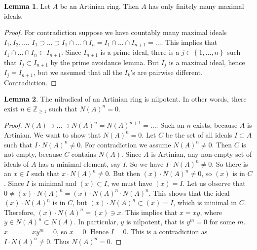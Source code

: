 \documentclass{article}
\newcommand{\Z}{\mathbb{Z}}
\newcommand{\rb}[1]{\left( #1 \right)}
\newcommand{\cb}[1]{\left\{ #1 \right\}}
\theoremstyle{definition}\newtheorem{definition}{Definition}[section]
\theoremstyle{definition}\newtheorem{remark}[definition]{Remark}
\theoremstyle{definition}\newtheorem*{example}{Example}
\theoremstyle{definition}\newtheorem*{note}{Note}
\newtheorem{lemma}[definition]{Lemma}
\begin{document}
\begin{lemma}
Let $ A $ be an Artinian ring. Then $ A $ has only finitely many maximal ideals.
\end{lemma}

\begin{proof}
For contradiction suppose we have countably many maximal ideals $ I_1, I_2, \dots $. $ I_1 \supset \dots \supset I_1 \cap \dots \cap I_n = I_1 \cap \dots \cap I_{n + 1} = \dots $. This implies that $ I_1 \cap \dots \cap I_n \subset I_{n + 1} $. Since $ I_{n + 1} $ is a prime ideal, there is a $ j \in \cb{1, \dots, n} $ such that $ I_j \subset I_{n + 1} $ by the prime avoidance lemma. But $ I_j $ is a maximal ideal, hence $ I_j = I_{n + 1} $, but we assumed that all the $ I_k $'s are pairwise different. Contradiction.
\end{proof}

\begin{lemma}
The nilradical of an Artinian ring is nilpotent. In other words, there exist $ n \in \Z_{\ge 1} $ such that $ N\rb{A}^n = 0 $.
\end{lemma}

\begin{proof}
$ N\rb{A} \supset \dots \supset N\rb{A}^n = N\rb{A}^{n + 1} = \dots $. Such an $ n $ exists, because $ A $ is Artinian. We want to show that $ N\rb{A}^n = 0 $. Let $ C $ be the set of all ideals $ I \subset A $ such that $ I \cdot N\rb{A}^n \ne 0 $. For contradiction we assume $ N\rb{A}^n \ne 0 $. Then $ C $ is not empty, because $ C $ contains $ N\rb{A} $. Since $ A $ is Artinian, any non-empty set of ideals of $ A $ has a minimal element, say $ I $. So we have $ I \cdot N\rb{A}^n \ne 0 $. So there is an $ x \in I $ such that $ x \cdot N\rb{A}^n \ne 0 $. But then $ \rb{x} \cdot N\rb{A}^n \ne 0 $, so $ \rb{x} $ is in $ C $. Since $ I $ is minimal and $ \rb{x} \subset I $, we must have $ \rb{x} = I $. Let us observe that $ 0 \ne \rb{x} \cdot N\rb{A}^n = \rb{x} \cdot N\rb{A}^n \cdot N\rb{A}^n $. This shows that the ideal $ \rb{x} \cdot N\rb{A}^n $ is in $ C $, but $ \rb{x} \cdot N\rb{A}^n \subset \rb{x} = I $, which is minimal in $ C $. Therefore, $ \rb{x} \cdot N\rb{A}^n = \rb{x} \ni x $. This implies that $ x = xy $, where $ y \in N\rb{A}^n \subset N\rb{A} $. In particular, $ y $ is nilpotent, that is $ y^m = 0 $ for some $ m $. $ x = \dots = xy^m = 0 $, so $ x = 0 $. Hence $ I = 0 $. This is a contradiction as $ I \cdot N\rb{A}^n \ne 0 $. Thus $ N\rb{A}^n = 0 $.
\end{proof}
\end{document}
